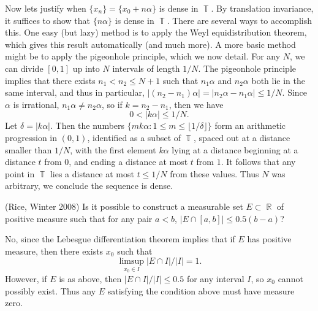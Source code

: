 \documentclass[answers]{exam}
\DeclareMathOperator{\RR}{\mathbb{R}}
\DeclareMathOperator{\TT}{\mathbb{T}}
\begin{document}
\begin{questions}
\begin{solution}
	Now lets justify when $\{ x_n \} = \{ x_0 + n \alpha \}$ is dense in $\TT$. By translation invariance, it suffices to show that $\{ n \alpha \}$ is dense in $\TT$. There are several ways to accomplish this. One easy (but lazy) method is to apply the Weyl equidistribution theorem, which gives this result automatically (and much more). A more basic method might be to apply the pigeonhole principle, which we now detail. For any $N$, we can divide $[0,1]$ up into $N$ intervals of length $1/N$. The pigeonhole principle implies that there exists $n_1 < n_2 \leq N + 1$ such that $n_1 \alpha$ and $n_2 \alpha$ both lie in the same interval, and thus in particular, $|(n_2 - n_1) \alpha| = |n_2 \alpha - n_1 \alpha| \leq 1/N$. Since $\alpha$ is irrational, $n_1 \alpha \neq n_2 \alpha$, so if $k = n_2 - n_1$, then we have
	\[ 0 < |k \alpha| \leq 1/N. \]
	Let $\delta = |k \alpha|$. Then the numbers $\{ m k\alpha : 1 \leq m \leq \lfloor 1/\delta \rfloor \}$ form an arithmetic progression in $(0,1)$, identified as a subset of $\TT$, spaced out at a distance smaller than $1/N$, with the first element $k \alpha$ lying at a distance beginning at a distance $t$ from $0$, and ending a distance at most $t$ from $1$. It follows that any point in $\TT$ lies a distance at most $t \leq 1/N$ from these values. Thus $N$ was arbitrary, we conclude the sequence is dense.
\end{solution}

\question (Rice, Winter 2008) Is it possible to construct a measurable set $E \subset \RR$ of positive measure such that for any pair $a < b$, $|E \cap [a,b]| \leq 0.5 (b - a)$?
\begin{solution}
    No, since the Lebesgue differentiation theorem implies that if $E$ has positive measure, then there exists $x_0$ such that
    \[ \limsup_{x_0 \in I} |E \cap I|/|I| = 1. \]
    However, if $E$ is as above, then $|E \cap I| / |I| \leq 0.5$ for any interval $I$, so $x_0$ cannot possibly exist. Thus any $E$ satisfying the condition above must have measure zero.
\end{solution}


\end{questions}
\end{document}
